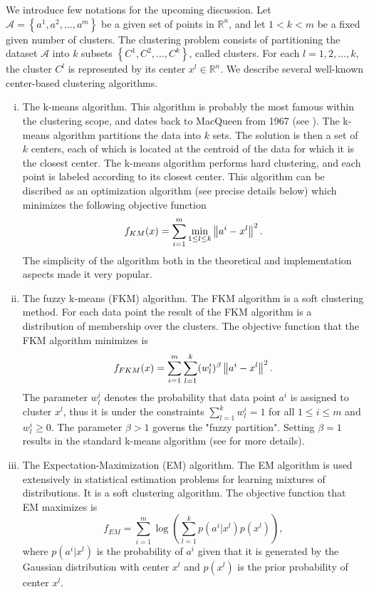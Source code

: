 We introduce few notations for the upcoming discussion. Let $\mathcal{A}= \left\lbrace a^1, a^2, \ldots ,a^m \right\rbrace$ be a given set of points in $\mathbb{R}^n$, and let $1 < k < m$ be a fixed given number of clusters. The clustering problem consists of partitioning the dataset $\mathcal{A}$ into $k$ subsets $\left\lbrace C^1, C^2, \ldots ,C^k \right\rbrace$, called clusters. For each $l=1, 2, \ldots ,k$, the cluster $C^l$ is represented by its center $x^l \in \mathbb{R}^n$. We describe several well-known center-based clustering algorithms.
\begin{enumerate}[(i)]
	\item The k-means algorithm. This algorithm is probably the most famous within the clustering scope, and dates back to MacQueen from 1967 (see \cite{M1967}). The k-means algorithm partitions the data into $k$ sets. The solution is then a set of $k$ centers, each of which is located at the centroid of the data for which it is the closest center. The k-means algorithm performs hard clustering, and each point is labeled according to its closest center. This algorithm can be discribed as an optimization algorithm (see precise details below) which minimizes the following objective function
	\begin{equation*}
		f_{KM}(x) = \sum\limits_{i=1}^{m}\min\limits_{1 \le l \le k} \left\Vert {a^i-x^l} \right\Vert^2.
	\end{equation*}
	The simplicity of the algorithm both in the theoretical and implementation aspects made it very popular.
	\item The fuzzy k-means (FKM) algorithm. The FKM algorithm is a soft clustering method. For each data point the result of the FKM algorithm is a distribution of membership over the clusters. The objective function that the FKM algorithm minimizes is
	\begin{equation*}
		f_{FKM}(x) = \sum\limits_{i=1}^{m}\sum\limits_{l=1}^{k}(w^i_l)^\beta \left\Vert {a^i-x^l} \right\Vert^2.
	\end{equation*}
	The parameter $w^i_l$ denotes the probability that data point $a^i$ is assigned to cluster $x^l$, thus it is under the constraints $\sum_{l=1}^{k} w^i_l = 1$ for all $1 \leq i \leq m$ and $w^i_l \geq 0$. The parameter $\beta > 1$ governs the "fuzzy partition". Setting $\beta = 1$ results in the standard k-means algorithm (see  for more details).
	\item The Expectation-Maximization (EM) algorithm. The EM algorithm is used extensively in statistical estimation problems for learning mixtures of distributions. It is a soft clustering algorithm. The objective function that EM maximizes is 
	\begin{equation*}
		f_{EM} = \sum\limits_{i=1}^{m} \log \left( \sum\limits_{l=1}^{k} p\left(a^i|x^l\right) p\left(x^l\right) \right),
	\end{equation*}
	where  $p\left(a^i|x^l\right)$ is the probability of $a^i$ given that it is generated by the Gaussian distribution with center $x^l$ and $p\left(x^l\right)$ is the prior probability of center $x^l$.
\end{enumerate}
